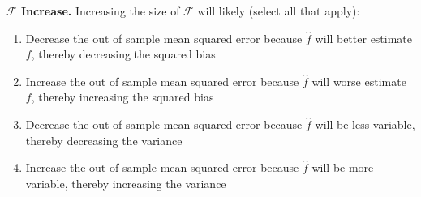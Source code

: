 \item {}
\textbf{$\mathcal{F}$ Increase.}
Increasing the size of $\mathcal{F}$ will likely  (select all that apply):

\begin{enumerate}[label=(\alph*)]
    \item Decrease the out of sample mean squared error because $\hat{f}$ will better estimate $f$, thereby decreasing the squared bias
    \item Increase the out of sample mean squared error because $\hat{f}$ will worse estimate $f$, thereby increasing the squared bias
    \item Decrease the out of sample mean squared error because $\hat{f}$ will be less variable, thereby decreasing the variance
    \item Increase the out of sample mean squared error because $\hat{f}$ will be more variable, thereby increasing the variance
\end{enumerate} 
